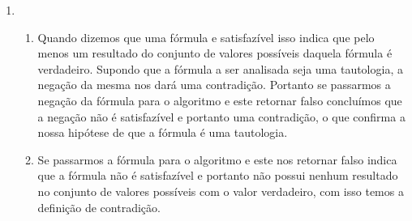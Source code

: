\begin{enumerate}
\begin{enumerate}
				$(P \land \neg Q) \lor (\neg P \land Q)$ e $(P \lor Q) \land \neg (P \land Q)$ s\~ao f\'ormulas equivalentes da l\'ogica proposicional, j\'a que apresentam resultados iguais pela tabela verdade.		
			\end{enumerate}
			
			\item 
			\begin{enumerate}
				
				\item Quando dizemos que uma f\'ormula e satisfaz\'ivel isso indica que pelo menos um resultado do conjunto de valores poss\'iveis daquela f\'ormula \'e verdadeiro. Supondo que a f\'ormula a ser analisada seja uma tautologia, a nega\c{c}\~ao da mesma nos dar\'a uma contradi\c{c}\~ao. Portanto se passarmos a nega\c{c}\~ao da f\'ormula para o algoritmo e este retornar falso conclu\'imos que a nega\c{c}\~ao n\~ao \'e satisfaz\'ivel e portanto uma contradi\c{c}\~ao, o que confirma a nossa hip\'otese de que a f\'ormula \'e uma tautologia.
				
				\item Se passarmos a f\'ormula para o algoritmo e este nos retornar falso indica que a f\'ormula n\~ao \'e satisfaz\'ivel e portanto n\~ao possui nenhum resultado no conjunto de valores poss\'iveis com o valor verdadeiro, com isso temos a defini\c{c}\~ao de contradi\c{c}\~ao.
				
			\end{enumerate}
			
			
	\end{enumerate}
	
